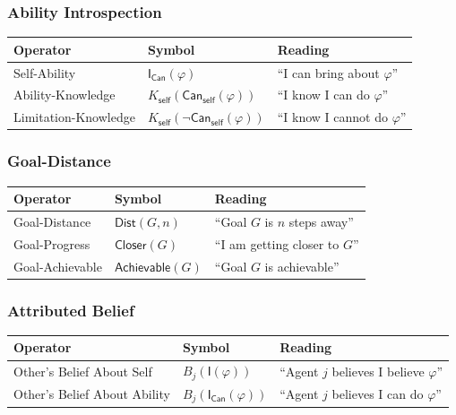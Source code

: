 \documentclass[../LogosReference.tex]{subfiles}
\begin{document}
\subsubsection{Ability Introspection}

\begin{center}
\begin{tabular}{lll}
\toprule
\textbf{Operator} & \textbf{Symbol} & \textbf{Reading} \\
\midrule
Self-Ability & $\mathsf{I}_{\mathsf{Can}}(\varphi)$ & ``I can bring about $\varphi$'' \\
Ability-Knowledge & $K_{\mathsf{self}}(\mathsf{Can}_{\mathsf{self}}(\varphi))$ & ``I know I can do $\varphi$'' \\
Limitation-Knowledge & $K_{\mathsf{self}}(\neg\mathsf{Can}_{\mathsf{self}}(\varphi))$ & ``I know I cannot do $\varphi$'' \\
\bottomrule
\end{tabular}
\end{center}

\subsubsection{Goal-Distance}

\begin{center}
\begin{tabular}{lll}
\toprule
\textbf{Operator} & \textbf{Symbol} & \textbf{Reading} \\
\midrule
Goal-Distance & $\mathsf{Dist}(G, n)$ & ``Goal $G$ is $n$ steps away'' \\
Goal-Progress & $\mathsf{Closer}(G)$ & ``I am getting closer to $G$'' \\
Goal-Achievable & $\mathsf{Achievable}(G)$ & ``Goal $G$ is achievable'' \\
\bottomrule
\end{tabular}
\end{center}

\subsubsection{Attributed Belief}

\begin{center}
\begin{tabular}{lll}
\toprule
\textbf{Operator} & \textbf{Symbol} & \textbf{Reading} \\
\midrule
Other's Belief About Self & $B_j(\mathsf{I}(\varphi))$ & ``Agent $j$ believes I believe $\varphi$'' \\
Other's Belief About Ability & $B_j(\mathsf{I}_{\mathsf{Can}}(\varphi))$ & ``Agent $j$ believes I can do $\varphi$'' \\
\bottomrule
\end{tabular}
\end{center}
\end{document}
